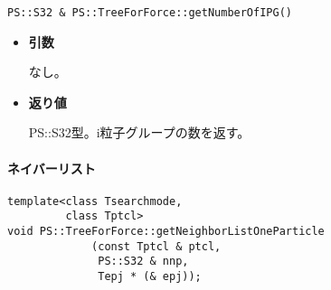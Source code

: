 \begin{screen}
\begin{verbatim}
PS::S32 & PS::TreeForForce::getNumberOfIPG()
\end{verbatim}
\end{screen}

\begin{itemize}

\item{{\bf 引数}}

なし。

\item{{\bf 返り値}}

{PS::S32}型。i粒子グループの数を返す。

\end{itemize}

%
%
%
%
%
%
%
%

\paragraph{ネイバーリスト}
\mbox{}

\begin{screen}
\begin{verbatim}
template<class Tsearchmode,
         class Tptcl>
void PS::TreeForForce::getNeighborListOneParticle
             (const Tptcl & ptcl,
              PS::S32 & nnp,
              Tepj * (& epj));
\end{verbatim}
\end{screen}

